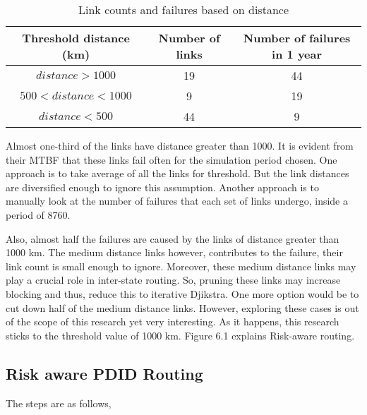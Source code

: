 \begin{table}
\centering
\caption{Link counts and failures based on distance}
 	\begin{tabular}{|c|c|c|}
	\hline\hline
	\textbf{Threshold distance (km)} & \textbf{Number of links} & \textbf{Number of failures in 1 year}\\
	\hline
	$distance>1000$ & 19&44\\
	$500<distance<1000$ &9&19\\
	$distance<500$&44&9\\
	\hline
	\end{tabular}
\end{table}


Almost one-third of the links have distance greater than 1000. It is evident from their MTBF that these links fail often for the simulation period chosen. One approach is to take average of all the links for threshold. But the link distances are diversified enough to ignore this assumption. Another approach is to manually look at the number of failures that each set of links undergo, inside a period of 8760. 

Also, almost half the failures are caused by the links of distance greater than 1000 km.  The medium distance links however, contributes to the failure, their link count is small enough to ignore. Moreover, these medium distance links may play a crucial role in inter-state routing. So, pruning these links may increase blocking and thus, reduce this to iterative Djikstra. One more option would be to cut down half of the medium distance links. However, exploring these cases is out of the scope of this research yet very interesting. As it happens, this research sticks to the threshold value of 1000 km. Figure 6.1 explains Risk-aware routing.

\subsection {Risk aware PDID Routing}

The steps are as follows,

